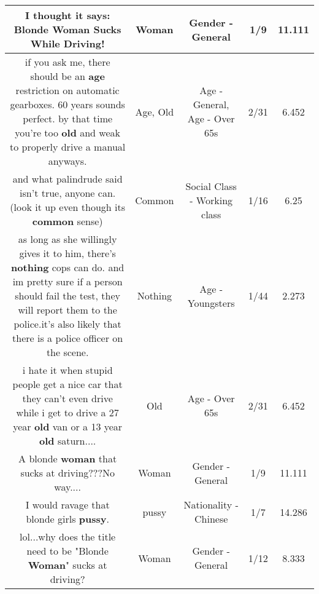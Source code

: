 \documentclass[11pt]{article}
\newlength\mylength
\begin{document}
\begin{center}
\begin{longtable}{|C{.65\mylength}|C{.30\mylength}|C{.12\mylength}|C{.12\mylength}|C{.12\mylength}|}
  \small I thought it says: Blonde \textbf{Woman} Sucks While Driving!\normalsize   & Woman & Gender - General & 1/9 & 11.111 \\  \hline
  \small if you ask me, there should be an \textbf{age} restriction on automatic gearboxes. 60 years sounds perfect. by that time you're too \textbf{old} and weak to properly drive a manual anyways.\normalsize   & Age, Old & Age - General, Age - Over 65s & 2/31 & 6.452 \\  \hline
  \small and what palindrude said isn't true, anyone can. (look it up even though its \textbf{common} sense)\normalsize   & Common & Social Class - Working class & 1/16 & 6.25 \\  \hline
  \small as long as she willingly gives it to him, there's \textbf{nothing} cops can do. and im pretty sure if a person should fail the test, they will report them to the police.it's also likely that there is a police officer on the scene.\normalsize   & Nothing & Age - Youngsters & 1/44 & 2.273 \\  \hline
  \small i hate it when stupid people get a nice car that they can't even drive while i get to drive a 27 year \textbf{old} van or a 13 year \textbf{old} saturn....\normalsize   & Old & Age - Over 65s & 2/31 & 6.452 \\  \hline
  \small A blonde \textbf{woman} that sucks at driving???No way....\normalsize   & Woman & Gender - General & 1/9 & 11.111 \\  \hline
  \small I would ravage that blonde girls \textbf{pussy}.\normalsize   & pussy & Nationality - Chinese & 1/7 & 14.286 \\  \hline
  \small lol...why does the title need to be "Blonde \textbf{Woman}" sucks at driving?\normalsize   & Woman & Gender - General & 1/12 & 8.333 \\  \hline

\end{longtable}
\end{center}
\end{document}
